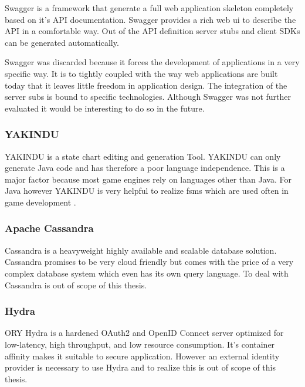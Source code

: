 Swagger is a framework that generate a full web application skeleton completely
based on it's API documentation. Swagger provides a rich web \gls{ui} to
describe the API in a comfortable way. Out of the API definition server stubs
and client SDKs can be generated automatically.

Swagger was discarded because it forces the development of applications in a
very specific way. It is to tightly coupled with the way web applications are
built today that it leaves little freedom in application design. The integration
of the server subs is bound to specific technologies. Although Swagger was not
further evaluated it would be interesting to do so in the future.

\subsubsection{YAKINDU}

YAKINDU is a state chart editing and generation Tool. YAKINDU can only generate
Java code and has therefore a poor language independence. This is a major factor
because most game engines rely on languages other than Java. For Java however
YAKINDU is very helpful to realize \glspl{fsm} which are used often in game
development \cite{bevilacqua2013fsm}.

\subsubsection{Apache Cassandra}

Cassandra is a heavyweight highly available and scalable database solution.
Cassandra promises to be very cloud friendly but comes with the price of a very
complex database system which even has its own query language. To deal with
Cassandra is out of scope of this thesis. 

\subsubsection{Hydra}

ORY Hydra is a hardened OAuth2 and OpenID Connect server optimized for
low-latency, high throughput, and low resource consumption. It's container
affinity makes it suitable to secure \ms{} application. However an
external identity provider is necessary to use Hydra and to realize this is out
of scope of this thesis.


